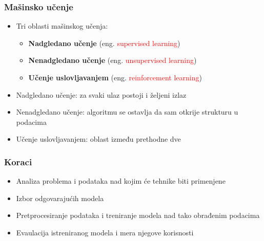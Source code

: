 \documentclass[11pt]{beamer}
\theoremstyle{definition}
\begin{document}
\begin{frame}
\frametitle{Mašinsko učenje}
\begin{itemize}
\item Tri oblasti mašinskog učenja:
	\begin{itemize}
	\item \textbf{Nadgledano učenje} (eng. \textcolor{red}{supervised learning})
	\item \textbf{Nenadgledano učenje} (eng. \textcolor{red}{unsupervised learning})
	\item \textbf{Učenje uslovljavanjem} (eng. \textcolor{red}{reinforcement learning})
	\end{itemize}
\item Nadgledano učenje: za svaki ulaz postoji i željeni izlaz
\item Nenadgledano učenje: algoritmu se ostavlja da sam otkrije strukturu u podacima
\item Učenje uslovljavanjem: oblast između prethodne dve
\end{itemize}
\end{frame}

\begin{frame}
\frametitle{Koraci}
\begin{itemize}
\item Analiza problema i podataka nad kojim će tehnike biti primenjene
\item Izbor odgovarajućih modela
\item Pretprocesiranje podataka i treniranje modela nad tako obrađenim podacima
\item Evaulacija istreniranog modela i mera njegove korisnosti
\end{itemize}
\end{frame}
\end{document}

